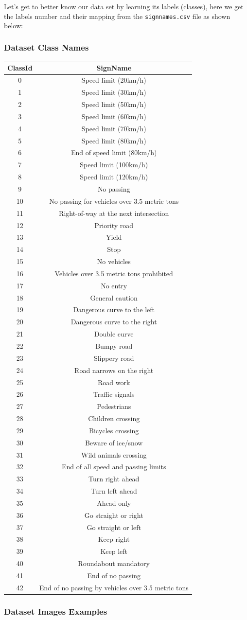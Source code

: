 \documentclass[11pt]{article}
\begin{document}
Let's get to better know our data set by learning its labels (classes),
here we get the labels number and their mapping from the
\texttt{signnames.csv} file as shown below:

\hypertarget{dataset-class-names}{%
\subsubsection{Dataset Class Names}\label{dataset-class-names}}

\begin{longtable}[]{@{}cc@{}}
\toprule
ClassId & SignName\tabularnewline
\midrule
\endhead
0 & Speed limit (20km/h)\tabularnewline
1 & Speed limit (30km/h)\tabularnewline
2 & Speed limit (50km/h)\tabularnewline
3 & Speed limit (60km/h)\tabularnewline
4 & Speed limit (70km/h)\tabularnewline
5 & Speed limit (80km/h)\tabularnewline
6 & End of speed limit (80km/h)\tabularnewline
7 & Speed limit (100km/h)\tabularnewline
8 & Speed limit (120km/h)\tabularnewline
9 & No passing\tabularnewline
10 & No passing for vehicles over 3.5 metric tons\tabularnewline
11 & Right-of-way at the next intersection\tabularnewline
12 & Priority road\tabularnewline
13 & Yield\tabularnewline
14 & Stop\tabularnewline
15 & No vehicles\tabularnewline
16 & Vehicles over 3.5 metric tons prohibited\tabularnewline
17 & No entry\tabularnewline
18 & General caution\tabularnewline
19 & Dangerous curve to the left\tabularnewline
20 & Dangerous curve to the right\tabularnewline
21 & Double curve\tabularnewline
22 & Bumpy road\tabularnewline
23 & Slippery road\tabularnewline
24 & Road narrows on the right\tabularnewline
25 & Road work\tabularnewline
26 & Traffic signals\tabularnewline
27 & Pedestrians\tabularnewline
28 & Children crossing\tabularnewline
29 & Bicycles crossing\tabularnewline
30 & Beware of ice/snow\tabularnewline
31 & Wild animals crossing\tabularnewline
32 & End of all speed and passing limits\tabularnewline
33 & Turn right ahead\tabularnewline
34 & Turn left ahead\tabularnewline
35 & Ahead only\tabularnewline
36 & Go straight or right\tabularnewline
37 & Go straight or left\tabularnewline
38 & Keep right\tabularnewline
39 & Keep left\tabularnewline
40 & Roundabout mandatory\tabularnewline
41 & End of no passing\tabularnewline
42 & End of no passing by vehicles over 3.5 metric tons\tabularnewline
\bottomrule
\end{longtable}

\hypertarget{dataset-images-examples}{%
\subsubsection{Dataset Images Examples}\label{dataset-images-examples}}
\end{document}
